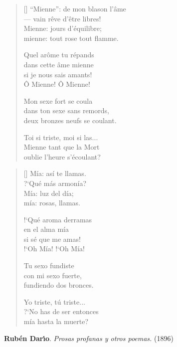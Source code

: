 



\settowidth{\versewidth}{``Mienne'': de mon blason l'âme}

\bigskip

\begin{verse}[\versewidth]
``Mienne'': de mon blason l'âme \\
--- vain rêve d'être libres! \\
Mienne: jours d'équilibre; \\
mienne: tout rose tout flamme.

Quel arôme tu répands \\
dans cette âme mienne \\
si je nous sais amants! \\
Ô Mienne! Ô Mienne!

Mon sexe fort se coula \\
dans ton sexe sans remords, \\
deux bronzes neufs se coulant.

Toi si triste, moi si las... \\
Mienne tant que la Mort \\
oublie l'heure s'écoulant?
\end{verse}



\settowidth{\versewidth}{?`No has de ser entonces}

\bigskip

\begin{verse}[\versewidth]
Mía: así te llamas. \\
?`Qué más armonía? \\
Mía: luz del día; \\
mía: rosas, llamas.

!`Qué aroma derramas \\
en el alma mía \\
si sé que me amas! \\
!`Oh Mía! !`Oh Mía!

Tu sexo fundiste \\
con mi sexo fuerte, \\
fundiendo dos bronces.

Yo triste, tú triste... \\
?`No has de ser entonces \\
mía hasta la muerte?
\end{verse}

\bigskip \bigskip

\hspace*{20mm} {\bf Rub\'en Dar\'{\i}o}. {\em Prosas profanas y otros poemas.} (1896)
